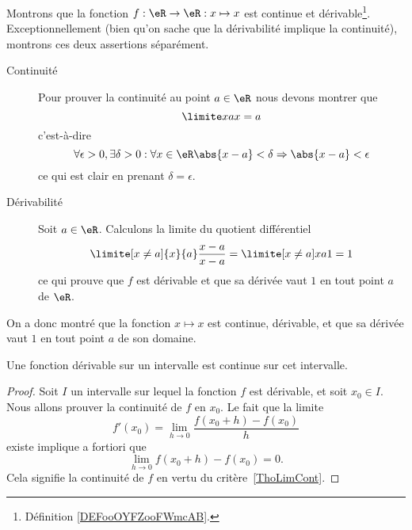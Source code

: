 \begin{example}
	Montrons que la fonction \( f : \eR \to \eR : x\mapsto x\) est continue et dérivable\footnote{Définition \ref{DEFooOYFZooFWmcAB}.}. Exceptionnellement (bien qu'on sache que la dérivabilité implique la continuité), montrons ces deux assertions séparément.
	\begin{description}
		\item[Continuité] Pour prouver la continuité au point \( a \in \eR\) nous devons montrer que
			\begin{equation}
				\limite x a x = a
			\end{equation}
			c'est-à-dire
			\begin{equation}
				\forall \epsilon > 0, \exists \delta > 0 :  \forall x \in \eR \abs{x-a} <
				\delta \Rightarrow \abs{x-a} < \epsilon
			\end{equation}
			ce qui est clair en prenant \( \delta = \epsilon\).

		\item[Dérivabilité] Soit \( a \in \eR\). Calculons la limite du quotient différentiel
			\begin{equation}
				\limite[x\neq a]{x}{a} \frac{x-a}{x-a} = \limite[x\neq a]x a 1 = 1
			\end{equation}
			ce qui prouve que \( f\) est dérivable et que sa dérivée vaut \( 1\) en
			tout point \( a\) de \( \eR\).
	\end{description}

	On a donc montré que la fonction \( x \mapsto x\) est continue, dérivable, et que sa dérivée vaut \( 1\) en tout point \( a\) de son domaine.

\end{example}

\begin{proposition} \label{PropSFyxOWF}
	Une fonction dérivable sur un intervalle est continue sur cet intervalle.
\end{proposition}

\begin{proof}
	Soit \( I\) un intervalle sur lequel la fonction \( f\) est dérivable, et soit \( x_0\in I\). Nous allons prouver la continuité de \( f\) en \( x_0\). Le fait que la limite
	\begin{equation}
		f'(x_0)=\lim_{h\to 0} \frac{ f(x_0+h)-f(x_0) }{ h }
	\end{equation}
	existe implique a fortiori que
	\begin{equation}
		\lim_{h\to 0} f(x_0+h)-f(x_0)=0.
	\end{equation}
	Cela signifie la continuité de \( f\) en vertu du critère~\ref{ThoLimCont}.
\end{proof}

